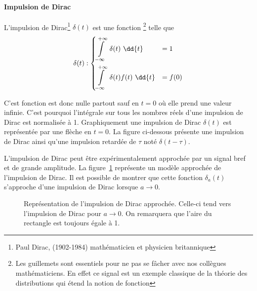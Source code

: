 \paragraph{Impulsion de Dirac}

L'impulsion de Dirac\footnote{Paul Dirac, (1902-1984) 
mathématicien et physicien britannique} $\delta(t)$ est une \og fonction\fg 
\footnote{Les guillemets sont essentiels pour ne pas se fâcher avec 
nos collègues mathématiciens. En effet ce signal est un exemple classique de la 
théorie des distributions qui étend la notion de fonction} telle que
\begin{align*}
\delta(t) : 
\begin{dcases}
	\int\limits_{-\infty}^{+\infty}	 \delta(t)\,\,\dd{t}&=1   \\
\int\limits_{-\infty}^{+\infty}  \delta(t)f(t)\,\,\dd{t}&=f(0)	
\end{dcases}
\end{align*}

C'est fonction est donc nulle partout sauf en $t=0$ où elle prend 
une valeur infinie. C'est pourquoi l'intégrale sur tous les nombres réels 
d'une impulsion de Dirac est normalisée à 1.
Graphiquement une impulsion de Dirac $\delta(t)$ est 
représentée par une flèche en $t=0$. La figure ci-dessous présente 
une impulsion de Dirac ainsi qu'une 
impulsion retardée de $\tau$ noté $\delta(t-\tau)$.

\begin{figure}[!h]
    \centering
    
\end{figure}

L'impulsion de Dirac peut être expérimentalement approchée par un signal 
bref et de grande amplitude. La figure~\ref{fig-dirac2} représente un modèle 
approchée de l'impulsion de Dirac. Il est possible de montrer que cette fonction
$\delta_a(t)$ s'approche d'une impulsion de Dirac lorsque $a\to0$.
\begin{figure}[!h]
    \centering
    
    \caption{Représentation de l'impulsion de Dirac approchée. 
             Celle-ci tend vers l'impulsion de Dirac pour $a\to0$. 
             On remarquera que l'aire du rectangle est toujours égale à 1.
             \label{fig-dirac2}}
\end{figure}


